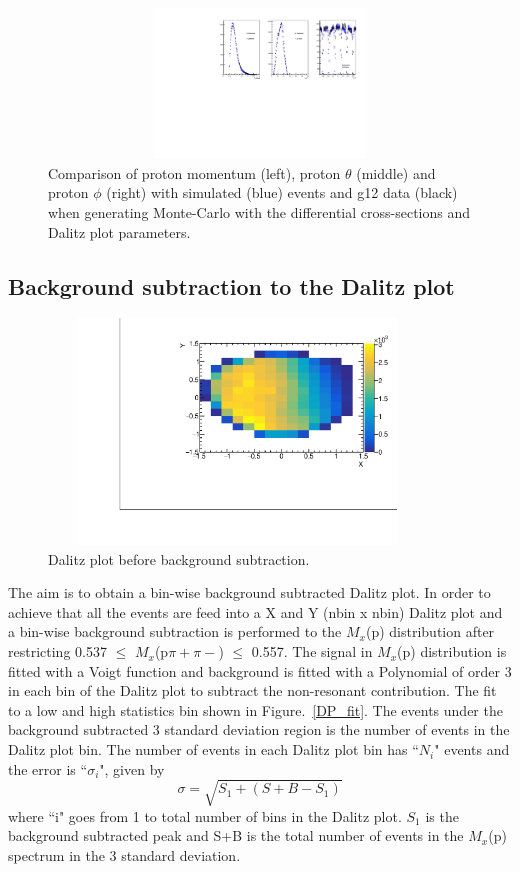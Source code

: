 \begin{figure}[ht!]
\centerline{
\includegraphics[width=14cm,height=4cm]{P.pdf}}
\caption{Comparison of proton momentum (left), proton $\theta$ (middle) and proton $\phi$ (right) with simulated (blue) events and g12 data (black) when generating Monte-Carlo with the differential cross-sections and Dalitz plot parameters.}
\label{fig9}
\end{figure}
 
 
 \subsection{Background subtraction to the Dalitz plot}

\begin{figure}[ht!]
\centerline{
\includegraphics[width=10cm,height=6cm]{Before_BS.pdf}}
\caption{Dalitz plot before background subtraction.}
\label{B4_DP}
\end{figure}

The aim is to obtain a bin-wise background subtracted Dalitz plot. In order to achieve that all the events are feed into a X and Y (nbin x nbin) Dalitz plot and a bin-wise background subtraction is performed to the $M_{x}$(p) distribution after restricting 0.537 $\leq$ $M_{x}$(p$\pi{+}$$\pi{-}$) $\leq$ 0.557. The signal in $M_{x}$(p) distribution is fitted with a Voigt function and background is fitted with a Polynomial of order 3 in each bin of the Dalitz plot to subtract the non-resonant contribution. The fit to a low and high statistics bin shown in Figure.~\ref{DP_fit}. The events under the background subtracted 3 standard deviation region is the number of events in the Dalitz plot bin. The number of events in each Dalitz plot bin has ``$N_{i}$" events and the error is ``$\sigma_{i}$", given by 
\begin{equation}
\sigma = \sqrt{S_{1} + (S+B - S_{1})}
\end{equation}
where ``i" goes from 1 to total number of bins in the Dalitz plot. $S_{1}$ is the background subtracted peak and S+B is the total number of events in the $M_{x}$(p) spectrum in the 3 standard deviation.

